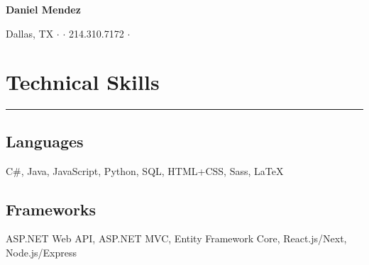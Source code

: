 \documentclass[10pt]{article}
\begin{document}
\begin{center}
    \large{\huge\textbf{Daniel Mendez}}
\end{center}
\vspace{-.4cm}
\begin{center}
    Dallas, TX {\onehalfspacing} $\cdot$ {\onehalfspacing} \textit{\href{https://mail.google.com/mail/?view=cm&fs=1&to=dmtx97@gmail.com}{\underline{}}} {\onehalfspacing} $\cdot$ {\onehalfspacing} 214.310.7172 {\onehalfspacing} $\cdot$ {\onehalfspacing} \textit{\href{https://danielmendez.site}{\underline{}}}
\end{center}
\vspace{-.6cm}

\section*{Technical Skills}
\vspace{-.6cm}
\par\noindent\textcolor{black}{\rule{\textwidth}{.5pt}} 

\begin{paracol}{2}
    \begin{leftcolumn} \vspace{-.4cm}
        \sloppy
        \subsection*{Languages}
        \begin{flushleft}            
            C\#, Java, JavaScript, Python, SQL, HTML+CSS, Sass, \LaTeX
        \end{flushleft}
    \end{leftcolumn}

    \begin{rightcolumn} \vspace{-.4cm}
        \subsection*{Frameworks}
        \begin{flushleft}            
            ASP.NET Web API, ASP.NET MVC, Entity Framework Core, React.js/Next, Node.js/Express
        \end{flushleft}
    \end{rightcolumn}
\end{paracol}
\vspace{-.6cm}
\end{document}
